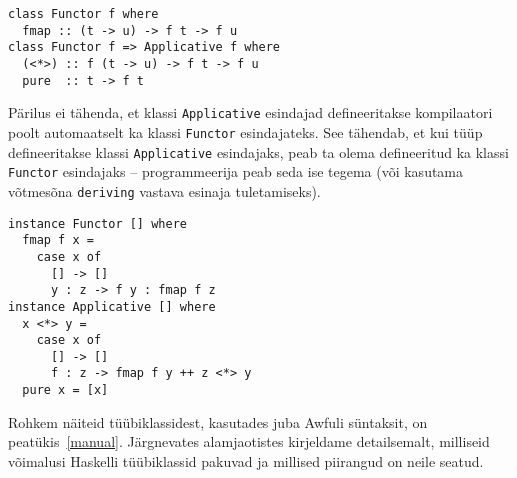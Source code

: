 \documentclass[12pt]{article}
\begin{document}
        \begin{verbatim}class Functor f where
  fmap :: (t -> u) -> f t -> f u
class Functor f => Applicative f where
  (<*>) :: f (t -> u) -> f t -> f u
  pure  :: t -> f t\end{verbatim}

        Pärilus ei tähenda, et klassi \verb!Applicative! esindajad defineeritakse kompilaatori poolt automaatselt ka klassi \verb!Functor! esindajateks. See tähendab, et kui tüüp defineeritakse klassi \verb!Applicative! esindajaks, peab ta olema defineeritud ka klassi \verb!Functor! esindajaks -- programmeerija peab seda ise tegema (või kasutama võtmesõna \verb!deriving! vastava esinaja tuletamiseks).

        \begin{verbatim}instance Functor [] where
  fmap f x =
    case x of
      [] -> []
      y : z -> f y : fmap f z
instance Applicative [] where
  x <*> y =
    case x of
      [] -> []
      f : z -> fmap f y ++ z <*> y
  pure x = [x]\end{verbatim}

        Rohkem näiteid tüübiklassidest, kasutades juba Awfuli süntaksit, on peatükis~\ref{manual}. Järgnevates alamjaotistes kirjeldame detailsemalt, milliseid võimalusi Haskelli tüübiklassid pakuvad ja millised piirangud on neile seatud.
\end{document}
